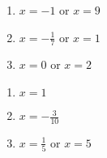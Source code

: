 \begin{multicols}{3} 
\begin{enumerate}
\setcounter{enumi}{\value{HW}}

\item $x = -1$ or $x = 9$

\item $x = -\frac{1}{7}$ or $x = 1$

\item $x = 0$ or $x = 2$

\setcounter{HW}{\value{enumi}}
\end{enumerate}
\end{multicols}

\begin{multicols}{3} 
\begin{enumerate}
\setcounter{enumi}{\value{HW}}

\item $x=1$

\item $x = -\frac{3}{10}$

\item $x = \frac{1}{5}$ or $x = 5$

\setcounter{HW}{\value{enumi}}
\end{enumerate}
\end{multicols}


